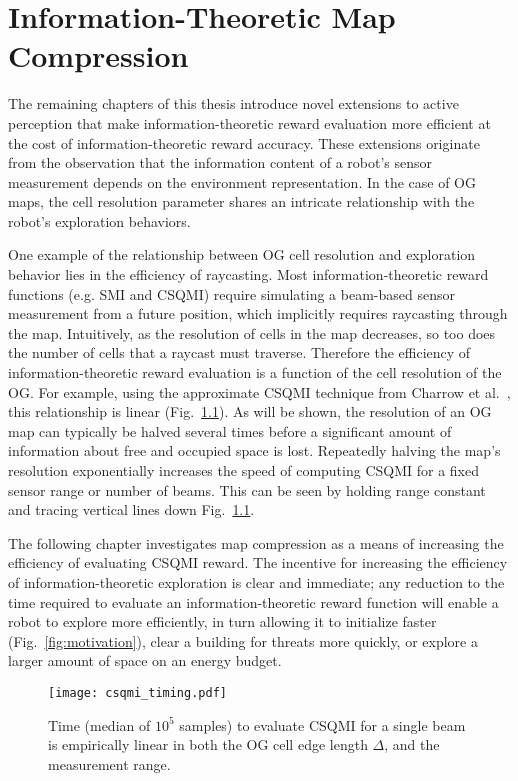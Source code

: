 \chapter{Information-Theoretic Map Compression}
\label{chapter3}

The remaining chapters of this thesis introduce novel extensions to active perception
that make information-theoretic reward evaluation more
efficient at the cost of information-theoretic reward accuracy.
These extensions originate from the observation that the information content
of a robot's sensor measurement depends on the environment
representation. In the case of OG maps, the cell resolution parameter shares an
intricate relationship with the robot's exploration behaviors.

One example of the relationship between OG cell resolution and exploration
behavior lies in the efficiency of raycasting. Most information-theoretic reward
functions (e.g. SMI and CSQMI) require simulating a beam-based sensor measurement from a future
position, which implicitly requires raycasting through the map. Intuitively, as
the resolution of cells in the map decreases, so too does the number of cells
that a raycast must traverse. Therefore the efficiency of information-theoretic reward evaluation
is a function of the cell resolution of the OG. For example, using the approximate
CSQMI technique from Charrow et al.~\cite{charrow2015icra}, this relationship is linear
(Fig.~\ref{fig:csqmi_timing}). As will be shown, the resolution of an OG map can typically be halved several
times before a significant amount of information about free and occupied space
is lost. Repeatedly halving the map's resolution exponentially increases the
speed of computing CSQMI for a fixed sensor range or number of beams. This
can be seen by holding range constant and tracing vertical lines down Fig.~\ref{fig:csqmi_timing}.

The following chapter investigates map compression as a means of increasing the
efficiency of evaluating CSQMI reward. The incentive for increasing the efficiency of information-theoretic exploration
is clear and immediate; any reduction to the time required to evaluate an
information-theoretic reward function will enable a robot to explore more
efficiently, in turn allowing it to initialize faster (Fig.~\ref{fig:motivation}), clear a
building for threats more quickly, or explore a larger amount of space on an energy budget.


\begin{figure}
  \centering
  \texttt{[image: csqmi\_timing.pdf]}
  \caption[Time complexity of computing CSQMI for a varying map resolution.]{Time (median of $10^5$ samples)
    to evaluate CSQMI for a single beam is empirically linear in both the OG
    cell edge length $\Delta$, and
  the measurement range. \label{fig:csqmi_timing}}
\end{figure}

